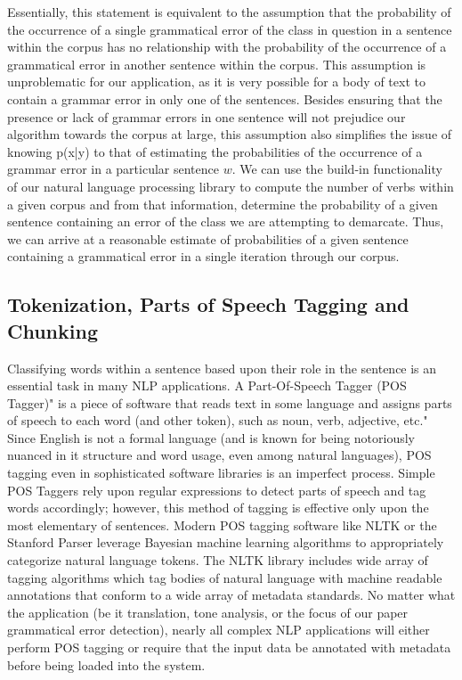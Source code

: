 \documentclass{article}
\begin{document}
Essentially, this statement is equivalent to the assumption that the probability of the occurrence of a single grammatical error of the class in question in a sentence within the corpus has no relationship with the probability of the occurrence of a grammatical error in another sentence within the corpus. This assumption is unproblematic for our application, as it is very possible for a body of text to contain a grammar error in only one of the sentences. Besides ensuring that the presence or lack of grammar errors in one sentence will not prejudice our algorithm towards the corpus at large, this assumption also simplifies the issue of knowing p(x|y) to that of estimating the probabilities of the occurrence of a grammar error in a particular sentence $w$. We can use the build-in functionality of our natural language processing library to compute the number of verbs within a given corpus and from that information, determine the probability of a given sentence containing an error of the class we are attempting to demarcate. Thus, we can arrive at a reasonable estimate of  probabilities of a given sentence containing a grammatical error in a single iteration through our corpus. 

\subsection{Tokenization, Parts of Speech Tagging and Chunking}
Classifying words within a sentence based upon their role in the sentence is an essential task in many NLP applications. A Part-Of-Speech Tagger (POS Tagger)" is a piece of software that reads text in some language and assigns parts of speech to each word (and other token), such as noun, verb, adjective, etc."  \citep{Stanford} Since English is not a formal language (and is known for being notoriously nuanced in it structure and word usage, even among natural languages), POS tagging even in sophisticated software libraries is an imperfect process. Simple POS Taggers rely upon regular expressions to detect parts of speech and tag words accordingly; however, this method of tagging is effective only upon the most elementary of sentences. Modern POS tagging software like NLTK or the Stanford Parser \citep{Stanford} leverage Bayesian machine learning algorithms  \citep{NLTKAPI} to appropriately categorize natural language tokens. The NLTK library \citep{NLTK} includes wide array of tagging algorithms which tag bodies of natural language with machine readable annotations that conform to a wide array of metadata standards. No matter what the application (be it translation, tone analysis, or the focus of our paper grammatical error detection), nearly all complex NLP applications will either perform POS tagging or require that the input data be annotated with metadata before being loaded into the system. 
\end{document}
